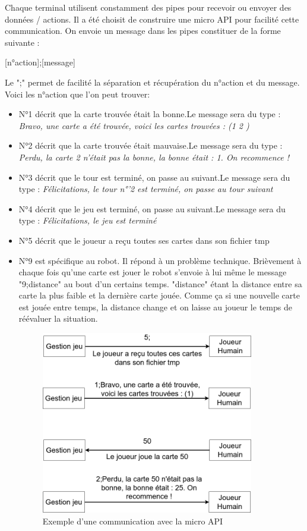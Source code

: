 \documentclass{article}
\begin{document}
Chaque terminal utilisent constamment des pipes pour recevoir ou envoyer des données / actions. Il a été choisit de construire une micro API pour facilité cette communication. On envoie un message dans les pipes constituer de la forme suivante :
\begin{center}
[n°action];[message]
\end{center}
Le ";" permet de facilité la séparation et récupération du n°action et du message. Voici les n°action que l'on peut trouver:
\begin{itemize}
	\item N°1 décrit que la carte trouvée était la bonne.\newline Le message sera du type : \textit{Bravo, une carte a été trouvée, voici les cartes trouvées : (1 2 )}
	\item N°2 décrit que la carte trouvée était mauvaise.\newline Le message sera du type : \textit{Perdu, la carte 2 n'était pas la bonne, la bonne était : 1. On recommence !}  
	\item N°3 décrit que le tour est terminé, on passe au suivant.\newline Le message sera du type : \textit{Félicitations, le tour n°'2 est terminé, on passe au tour suivant} 
	\item N°4 décrit que le jeu est terminé, on passe au suivant.\newline Le message sera du type : \textit{Félicitations, le jeu est terminé}
	\item N°5 décrit que le joueur a reçu toutes ses cartes dans son fichier tmp     
	\item N°9 est spécifique au robot. Il répond à un problème technique. Brièvement à chaque fois qu'une carte est jouer le robot s'envoie à lui même le message "9;distance" au bout d'un certains temps. "distance" étant la distance entre sa carte la plus faible et la dernière carte jouée. Comme ça si une nouvelle carte est jouée entre temps, la distance change et on laisse au joueur le temps de réévaluer la situation.
	
\begin{figure}[!htb]
	\centering
    	\includegraphics[height=8cm]{./assets/pipe_com.png}
    	\caption{
	    	Exemple d'une communication avec la micro API
    	}
\end{figure}


\end{itemize}
\end{document}
